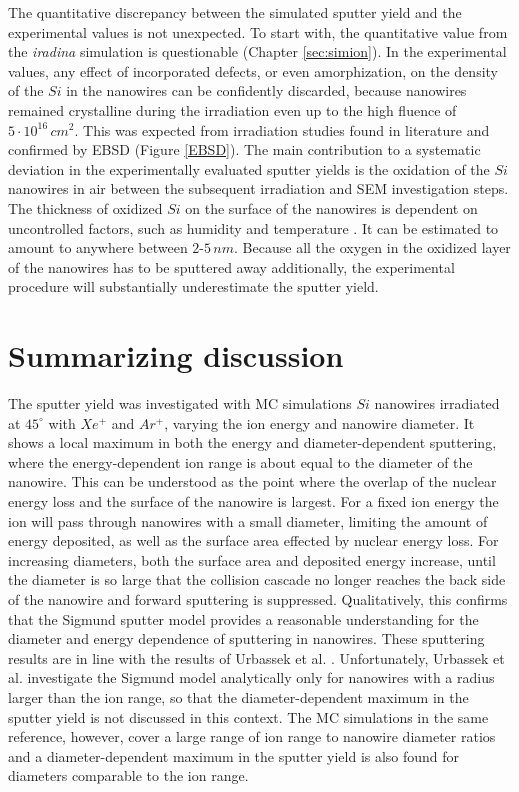 The quantitative discrepancy between the simulated sputter yield and the experimental values is not unexpected. To start with, the quantitative value from the \emph{iradina} simulation is questionable (Chapter \ref{sec:simion}). In the experimental values, any effect of incorporated defects, or even amorphization, on the density of the $Si$ in the nanowires can be confidently discarded, because nanowires remained crystalline during the irradiation even up to the high fluence of $5\cdot 10^{16}\,cm^2$. This was expected from irradiation studies found in literature \cite{pelaz_ion-beam-induced_2004} and confirmed by EBSD (Figure \ref{EBSD}). The main contribution to a systematic deviation in the experimentally evaluated sputter yields is the oxidation of the $Si$ nanowires in air between the subsequent irradiation and SEM investigation steps. The thickness of oxidized $Si$ on the surface of the nanowires is dependent on uncontrolled factors, such as humidity and temperature \cite{lukes_oxidation_1972,al-bayati_composition_1991}. It can be estimated to amount to anywhere between $2$-$5\,nm$. Because all the oxygen in the oxidized layer of the nanowires has to be sputtered away additionally, the experimental procedure will substantially underestimate the sputter yield.


\section{Summarizing discussion}

The sputter yield was investigated with MC simulations $Si$ nanowires irradiated at $45^\circ$ with $Xe^+$ and $Ar^+$, varying the ion energy and nanowire diameter. It shows a local maximum in both the energy and diameter-dependent sputtering, where the energy-dependent ion range is about equal to the diameter of the nanowire. This can be understood as the point where the overlap of the nuclear energy loss and the surface of the nanowire is largest. For a fixed ion energy the ion will pass through nanowires with a small diameter, limiting the amount of energy deposited, as well as the surface area effected by nuclear energy loss. For increasing diameters, both the surface area and deposited energy increase, until the diameter is so large that the collision cascade no longer reaches the back side of the nanowire and forward sputtering is suppressed. Qualitatively, this confirms that the Sigmund sputter model provides a reasonable understanding for the diameter and energy dependence of sputtering in nanowires. These sputtering results are in line with the results of Urbassek et al. \cite{urbassek_sputter_2015}. Unfortunately, Urbassek et al. investigate the Sigmund model analytically only for nanowires with a radius larger than the ion range, so that the diameter-dependent maximum in the sputter yield is not discussed in this context. The MC simulations in the same reference, however, cover a large range of ion range to nanowire diameter ratios and a diameter-dependent maximum in the sputter yield is also found for diameters comparable to the ion range. 
 
